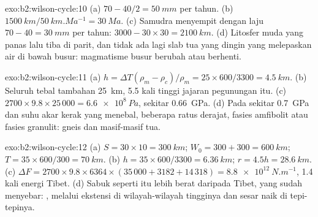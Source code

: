 \begin{solution}{exo:b2:wilson-cycle:10}
(a) $70 - 40/2 = \qty{50}{mm}$ per tahun. (b) $\qty{1500}{km}/\qty{50}{km.Ma^{-1}} =
\qty{30}{Ma}$. (c) Samudra menyempit dengan laju $70 - 40 = \qty{30}{mm}$ per tahun: $3000 - 30\times30 =
\qty{2100}{km}$. (d) Litosfer muda yang panas lalu tiba di parit, dan tidak ada lagi slab tua yang dingin
yang melepaskan air di bawah busur: magmatisme busur berubah atau berhenti.
\end{solution}

\begin{solution}{exo:b2:wilson-cycle:11}
(a) $h = \Delta T(\rho_m - \rho_c)/\rho_m = 25\times600/3300 = \qty{4.5}{km}$. (b) Seluruh tebal tambahan
\qty{25}{km}, 5.5 kali tinggi jajaran pegunungan itu. (c) $2700\times9.8\times25\,000 =
\qty{6.6e8}{Pa}$, sekitar \qty{0.66}{GPa}. (d) Pada sekitar \qty{0.7}{GPa} dan suhu
akar kerak yang menebal, beberapa ratus derajat, fasies amfibolit atau fasies
granulit: gneis dan  masif-masif tua.
\end{solution}

\begin{solution}{exo:b2:wilson-cycle:12}
(a) $S = 30\times10 = \qty{300}{km}$; $W_0 = 300 + 300 = \qty{600}{km}$; $T = 35\times600/300 =
\qty{70}{km}$. (b) $h = 35\times600/3300 = \qty{6.36}{km}$; $r = 4.5h = \qty{28.6}{km}$.
(c) $\Delta F = 2700\times9.8\times6364\times(35\,000 + 3182 + 14\,318) =
\qty{8.8e12}{N.m^{-1}}$, 1.4 kali energi Tibet. (d) Sabuk seperti itu lebih berat daripada Tibet, yang sudah
menyebar: , melalui ekstensi di wilayah-wilayah tingginya dan sesar naik di tepi-tepinya.
\end{solution}

